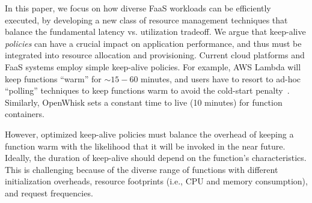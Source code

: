 \begin{comment}
In this paper, we explore this tradeoff, and argue for and develop principled keep-alive techniques. 
%
Current cloud platforms and FaaS systems employ simple keep-alive policies. 
%
For example, AWS Lambda will keep functions ``warm'' for $\sim 15-60$ minutes, and users have to resort to wasteful ``polling'' techniques to keep functions warm to avoid the cold-start penalty~\cite{lambda-warm, lambda-limits, lambda-warm-hour}. 
% 
An optimized keep-alive policy must balance the overhead of keeping a function warm with the likelihood that the function will be called again in the near future, and the duration of keep-alive should depend on the function's characteristics. 
%
Designing keep-alive policies is challenging because of the diverse range of functions with different initialization overheads, resource footprints (i.e., CPU and memory consumption),  and request frequencies. 
%
\end{comment}


%
In this paper, we focus on how diverse FaaS workloads can be efficiently executed, by developing a new class of resource management techniques that balance the fundamental latency vs. utilization tradeoff.
We argue that keep-alive \emph{policies} can have a crucial impact on application performance, and thus must be integrated into resource allocation and provisioning. %
Current cloud platforms and FaaS systems employ simple keep-alive policies. 
For example, AWS Lambda will keep functions ``warm'' for $\sim 15-60$ minutes, and users have to resort to ad-hoc ``polling'' techniques to keep functions warm to avoid the cold-start penalty~\cite{lambda-warm, lambda-limits, lambda-warm-hour}.
Similarly, OpenWhisk sets a constant time to live (10 minutes) for function containers.


However, optimized keep-alive policies must balance the overhead of keeping a function warm with the likelihood that it will be invoked in the near future. 
Ideally, the duration of keep-alive should depend on the function's characteristics. 
This is challenging because of the diverse range of functions with different initialization overheads, resource footprints (i.e., CPU and memory consumption),  and request frequencies. 


